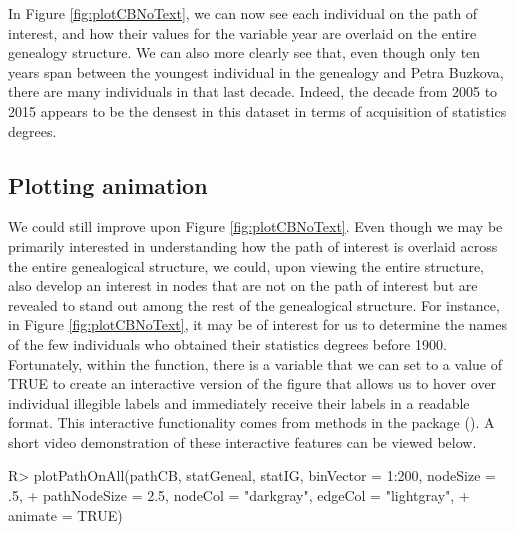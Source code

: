 \documentclass[article,shortnames]{jss}
\begin{document}
In Figure \ref{fig:plotCBNoText}, we can now see each individual on the path of interest, and how their values for the variable year are overlaid on the entire genealogy structure. We can also more clearly see that, even though only ten years span between the youngest individual in the genealogy and Petra Buzkova, there are many individuals in that last decade. Indeed, the decade from 2005 to 2015 appears to be the densest in this dataset in terms of acquisition of statistics degrees.

\subsection{Plotting animation}
\label{interaction}

We could still improve upon Figure \ref{fig:plotCBNoText}. Even though we may be primarily interested in understanding how the path of interest is overlaid across the entire genealogical structure, we could, upon viewing the entire structure, also develop an interest in nodes that are not on the path of interest but are revealed to stand out among the rest of the genealogical structure. For instance, in Figure \ref{fig:plotCBNoText}, it may be of interest for us to determine the names of the few individuals who obtained their statistics degrees before 1900. Fortunately, within the  function, there is a variable  that we can set to a value of TRUE to create an interactive version of the figure that allows us to hover over individual illegible labels and immediately receive their labels in a readable format. This interactive functionality comes from methods in the  package (\citealt{plotly}). A short video demonstration of these interactive features can be viewed below. 

\begin{CodeChunk}
\begin{CodeInput}
R> plotPathOnAll(pathCB, statGeneal, statIG, binVector = 1:200, nodeSize = .5,
+    pathNodeSize = 2.5, nodeCol = "darkgray", edgeCol = "lightgray",
+    animate = TRUE)
\end{CodeInput}
\end{CodeChunk}
\end{document}
